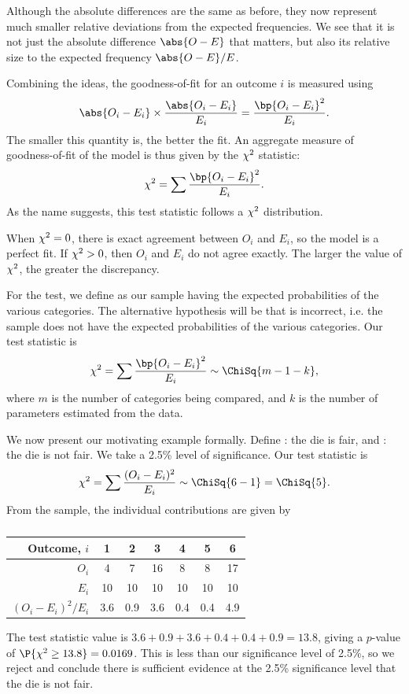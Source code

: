 Although the absolute differences are the same as before, they now represent much smaller relative deviations from the expected frequencies. We see that it is not just the absolute difference $\abs{O-E}$ that matters, but also its relative size to the expected frequency $\abs{O-E}/E$. 

Combining the ideas, the goodness-of-fit for an outcome $i$ is measured using \[\abs{O_i - E_i} \times \frac{\abs{O_i - E_i}}{E_i} = \frac{\bp{O_i - E_i}^2}{E_i}.\] The smaller this quantity is, the better the fit. An aggregate measure of goodness-of-fit of the model is thus given by the $\chi^2$ statistic: \[\c^2 = \sum \frac{\bp{O_i - E_i}^2}{E_i}.\] As the name suggests, this test statistic follows a $\chi^2$ distribution.

When $\chi^2 = 0$, there is exact agreement between $O_i$ and $E_i$, so the model is a perfect fit. If $\chi^2 > 0$, then $O_i$ and $E_i$ do not agree exactly. The larger the value of $\chi^2$, the greater the discrepancy.

For the test, we define \nullhyp{} as our sample having the expected probabilities of the various categories. The alternative hypothesis \althyp{} will be that \nullhyp{} is incorrect, i.e. the sample does not have the expected probabilities of the various categories. Our test statistic is \[\c^2 = \sum \frac{\bp{O_i - E_i}^2}{E_i} \sim \ChiSq{m-1-k},\] where $m$ is the number of categories being compared, and $k$ is the number of parameters estimated from the data.

\begin{example}
    We now present our motivating example formally. Define \nullhyp: the die is fair, and \althyp: the die is not fair. We take a 2.5\% level of significance. Our test statistic is \[\c^2 = \sum \frac{(O_i - E_i)^2}{E_i} \sim \ChiSq{6-1} = \ChiSq{5}.\] From the sample, the individual contributions are given by
    \begin{table}[H]
        \centering
        \begin{tabular}{|r|c|c|c|c|c|c|}
        \hline
        Outcome, $i$ & 1 & 2 & 3 & 4 & 5 & 6 \\ \hline
        $O_i$ & 4 & 7 & 16 & 8 & 8 & 17 \\ \hline
        $E_i$ & 10 & 10 & 10 & 10 & 10 & 10 \\ \hline
        $(O_i-E_i)^2/E_i$ & 3.6 & 0.9 & 3.6 & 0.4 & 0.4 & 4.9 \\ \hline
        \end{tabular}
        \caption{}
    \end{table}
    The test statistic value is $3.6 + 0.9 + 3.6 + 0.4 + 0.4 + 0.9 = 13.8$, giving a $p$-value of $\P{\c^2 \geq 13.8} = 0.0169$. This is less than our significance level of 2.5\%, so we reject \nullhyp{} and conclude there is sufficient evidence at the 2.5\% significance level that the die is not fair.
\end{example}

